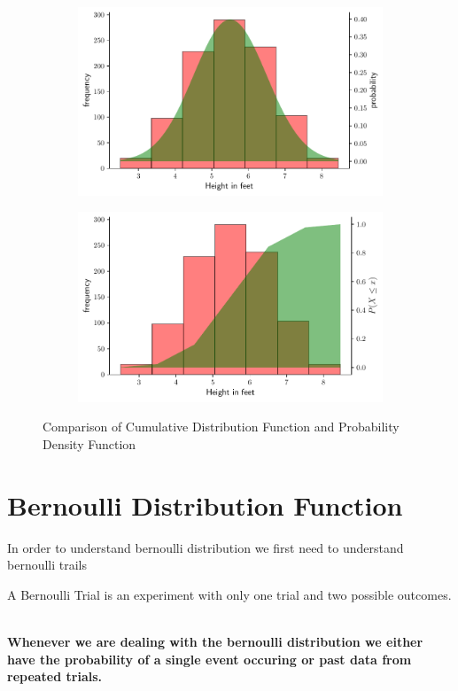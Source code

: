 \documentclass[twoside,12pt]{report}  %
\begin{document}
\begin{tcolorbox}[colback=blue!5!white, colframe=blue!75!black, title = \textbf{Cumulative Distribution Function for Probability Density Distribution}]
\begin{figure}[H]
\begin{subfigure}[b]{0.3\textwidth}
				\includegraphics[width=\textwidth]{./images/figure_probabilitydensityfunction_example.pdf}
			\end{subfigure}
			\begin{subfigure}[b]{0.3\textwidth}
				\includegraphics[width=\textwidth]{./images/figure_cumulativedistributionfunction_density_example.pdf}
			\end{subfigure}
		\caption{Comparison of Cumulative Distribution Function and Probability Density Function}
		\label{cdf_comparison}
	\end{figure}
	
\end{tcolorbox}

\section{Bernoulli Distribution Function}
In order to understand bernoulli distribution we first need to understand bernoulli trails
\\
\begin{tcolorbox}[colback=red!5!white, colframe=red!75!black, title = \textbf{Bernoulli Trial}]
	A Bernoulli Trial is an experiment with only one trial and two possible outcomes.  
\end{tcolorbox}
\noindent
\\
\textbf{Whenever we are dealing with the bernoulli distribution we either have the probability of a single event occuring or past data from repeated trials.}
\end{document}
